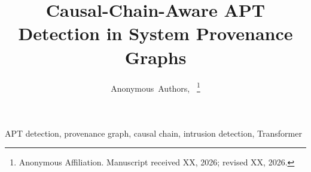 \documentclass[lettersize,journal]{IEEEtran}
\title{Causal-Chain-Aware APT Detection in System Provenance Graphs}
\author{Anonymous~Authors,~\IEEEmembership{Member,~IEEE}%
\thanks{Anonymous Affiliation. Manuscript received XX, 2026; revised XX, 2026.}}
\begin{document}
\maketitle

\begin{abstract}

\end{abstract}

\begin{IEEEkeywords}
APT detection, provenance graph, causal chain, intrusion detection, Transformer
\end{IEEEkeywords}











\end{document}
